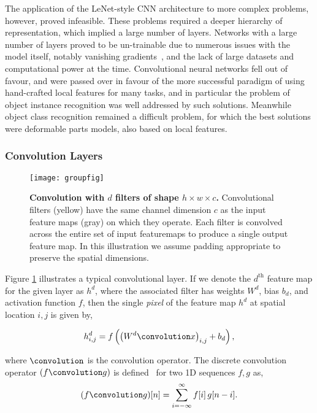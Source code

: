 \documentclass[thesis]{subfiles}
\begin{document}
The application of the LeNet-style CNN architecture to more complex problems, however, proved infeasible. These problems required a deeper hierarchy of representation, which implied a large number of layers. Networks with a large number of layers proved to be un-trainable due to numerous issues with the model itself, notably vanishing gradients~\citep{hochreiter1991untersuchungen}, and the lack of large datasets and computational power at the time. Convolutional neural networks fell out of favour, and were passed over in favour of the more successful paradigm of using hand-crafted local features for many tasks, and in particular the problem of object instance recognition was well addressed by such solutions. Meanwhile object class recognition remained a difficult problem, for which the best solutions were deformable parts models, also based on local features.

\subsubsection{Convolution Layers}
\begin{figure}[tb]
	\centering
	\texttt{[image: groupfig]}
	\caption[Illustration of convolutional layer]{\textbf{Convolution with $d$ filters of shape $h\times w\times c$.} Convolutional filters (yellow) have the same channel dimension $c$ as the input feature maps (gray) on which they operate. Each filter is convolved across the entire set of input featuremaps to produce a single output feature map. In this illustration we assume padding appropriate to preserve the spatial dimensions.}
	\label{fig:convlayer}
\end{figure}

Figure \ref{fig:convlayer} illustrates a typical convolutional layer. If we denote the $d^{\text{th}}$ feature map for the given layer as $h^d$, where the associated filter has weights $W^d$, bias $b_d$, and activation function $f$, then the single \emph{pixel} of the feature map $h^d$ at spatial location $i, j$ is given by,

\begin{equation}
	h^d_{i,j} = f\left( \left(W^d \convolution x \right)_{i,j} + b_d \right),
\end{equation}

where $\convolution$ is the convolution operator. The discrete convolution operator $(f \convolution g)$ is defined~\citep{damelin2011} for two 1D sequences $f, g$ as,
\begin{equation}
	(f \convolution g)[n] = \sum_{i=-\infty}^\infty f[i]\, g[n - i].
\end{equation}
\end{document}

